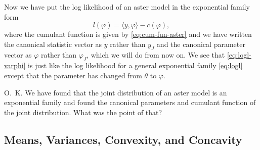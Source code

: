 \documentclass[11pt]{article}
\newcommand{\inner}[1]{\langle #1 \rangle}
\begin{document}
Now we have put the log likelihood of an aster model in the exponential
family form
\begin{equation} \label{eq:logl-varphi}
   l(\varphi) = \inner{y, \varphi} - c(\varphi),
\end{equation}
where the cumulant function is given by \eqref{eq:cum-fun-aster} and
we have written the canonical statistic vector as $y$ rather than $y_J$
and the canonical parameter vector as $\varphi$ rather than $\varphi_J$,
which we will do from now on.
We see that \eqref{eq:logl-varphi}
is just like the log likelihood for a general exponential
family \eqref{eq:logl} except that the parameter has changed
from $\theta$ to $\varphi$.

O.~K\@.  We have found that the joint distribution of an aster model is an
exponential family and found the canonical parameters and cumulant function
of the joint distribution.  What was the point of that?

\subsection{Means, Variances, Convexity, and Concavity} \label{sec:convex}
\end{document}
